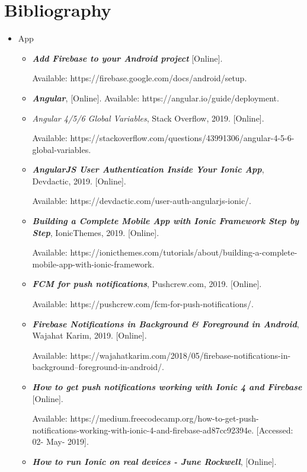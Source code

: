 \documentclass[12pt, a4paper]{report}
\begin{document}
\chapter{Bibliography}
\begin{itemize}
    \item App
    \begin{itemize}
        \item \textit{\textbf{Add Firebase to your Android project}} [Online]. 
        
        Available: https://firebase.google.com/docs/android/setup. 
        \item\textit{\textbf{Angular}}, [Online]. Available: https://angular.io/guide/deployment. 
        \item \textit{Angular 4/5/6 Global Variables}, Stack Overflow, 2019. [Online]. 
        
        Available: https://stackoverflow.com/questions/43991306/angular-4-5-6-global-variables. 
        \item\textit{\textbf{AngularJS User Authentication Inside Your Ionic App}}, Devdactic, 2019. [Online]. 
        
        Available: https://devdactic.com/user-auth-angularjs-ionic/. 
        \item\textit{\textbf{Building a Complete Mobile App with Ionic Framework Step by Step}}, IonicThemes, 2019. [Online].
        
        Available: https://ionicthemes.com/tutorials/about/building-a-complete-mobile-app-with-ionic-framework. 
        \item\textit{\textbf{FCM for push notifications}}, Pushcrew.com, 2019. [Online]. 
        
        Available: https://pushcrew.com/fcm-for-push-notifications/. 
        \item\textit{\textbf{Firebase Notifications in Background & Foreground in Android}}, Wajahat Karim, 2019. [Online].
        
        Available: https://wajahatkarim.com/2018/05/firebase-notifications-in-background--foreground-in-android/. 
        \item\textit{\textbf{How to get push notifications working with Ionic 4 and Firebase}} [Online]. 
        
        Available: https://medium.freecodecamp.org/how-to-get-push-notifications-working-with-ionic-4-and-firebase-ad87cc92394e. [Accessed: 02- May- 2019].
        \item\textit{\textbf{How to run Ionic on real devices - June Rockwell}},  [Online].
        

\end{itemize}
\end{itemize}
\end{document}
